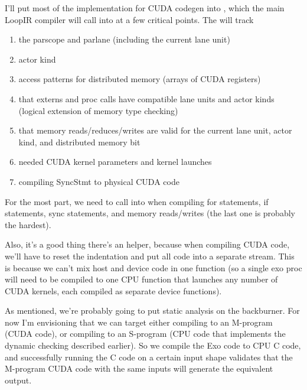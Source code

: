 I'll put most of the implementation for CUDA codegen into , which the main LoopIR compiler will call into at a few critical points.
The  will track
\begin{enumerate}
  \item the parscope and parlane (including the current lane unit)
  \item actor kind
  \item access patterns for distributed memory (arrays of CUDA registers)
  \item that externs and proc calls have compatible lane units and actor kinds (logical extension of memory type checking)
  \item that memory reads/reduces/writes are valid for the current lane unit, actor kind, and distributed memory bit
  \item needed CUDA kernel parameters and kernel launches
  \item compiling SyncStmt to physical CUDA code
\end{enumerate}

\filbreak
For the most part, we need to call into  when compiling for statements, if statements, sync statements, and memory reads/writes (the last one is probably the hardest).

\filbreak
Also, it's a good thing there's an  helper, because when compiling CUDA code, we'll have to reset the indentation and put all code into a separate stream.
This is because we can't mix host and device code in one function (so a single exo proc will need to be compiled to one CPU function that launches any number of CUDA kernels, each compiled as separate device functions).

\filbreak
{}

As mentioned, we're probably going to put static analysis on the backburner.
For now I'm envisioning that we can target either compiling to an M-program (CUDA code), or compiling to an S-program (CPU code that implements the dynamic checking described earlier).
So we compile the Exo code to CPU C code, and successfully running the C code on a certain input shape validates that the M-program CUDA code with the same inputs will generate the equivalent output.


